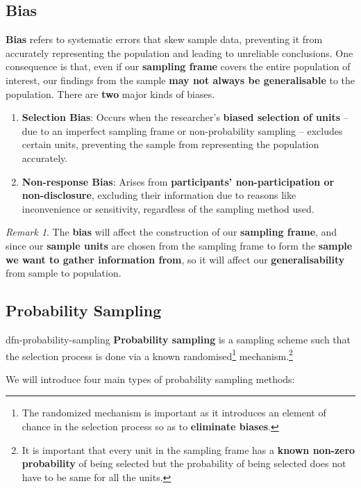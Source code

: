 \documentclass[math,code]{amznotes}
\theoremstyle{remark}
\newtheorem*{remark}{Remark}
\begin{document}
\subsection{Bias}
\textbf{Bias} refers to systematic errors that skew sample data, preventing it from accurately representing the population and leading to unreliable conclusions. One consequence is that, even if our \textbf{sampling frame} covers the entire population of interest, our findings from the sample \textbf{may not always be generalisable} to the population. There are \textbf{two} major kinds of biases.
\begin{enumerate}
    \item \textbf{Selection Bias}: Occurs when the researcher’s \textbf{biased selection of units} -- due to an imperfect sampling frame or non-probability sampling -- excludes certain units, preventing the sample from representing the population accurately.
    \item \textbf{Non-response Bias}: Arises from \textbf{participants’ non-participation or non-disclosure}, excluding their information due to reasons like inconvenience or sensitivity, regardless of the sampling method used.
\end{enumerate}
\begin{notebox}
    \begin{remark}
        The \textbf{bias} will affect the construction of our \textbf{sampling frame}, and since our \textbf{sample units} are chosen from the sampling frame to form the \textbf{sample we want to gather information from}, so it will affect our \textbf{generalisability} from sample to population.
    \end{remark}
\end{notebox}

\subsection{Probability Sampling}
\begin{dfnbox}{dfn-probability-sampling}
    \textbf{Probability sampling}  is a sampling scheme such that the selection process is done via a known randomised\footnote{The randomized mechanism is important as it introduces an element of chance in the selection process so as to \textbf{eliminate biases}.} mechanism.\footnote{ It is important that every unit in the sampling frame has a \textbf{known non-zero probability} of being selected but the probability of being selected does not have to be same for all the units.}
\end{dfnbox}
We will introduce four main types of probability sampling methods:
\end{document}
